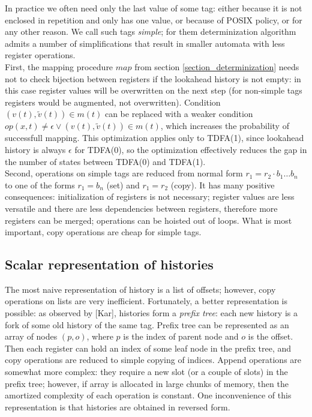 \documentclass{article}
\newcommand{\Xin}{\!\in\!}
\newcommand{\Xeq}{\!=\!}
\theoremstyle{definition}
\begin{document}
\begin{multicols}{2}
In practice we often need only the last value of some tag:
either because it is not enclosed in repetition and only has one value, or because of POSIX policy, or for any other reason.
We call such tags \emph{simple};
for them determinization algorithm admits a number of simplifications
that result in smaller automata with less register operations.
\\

First, the mapping procedure $map$ from section \ref{section_determinization}
needs not to check bijection between registers if the lookahead history is not empty:
in this case register values will be overwritten on the next step
(for non-simple tags registers would be augmented, not overwritten).
Condition $(v(t), \widetilde{v}(t)) \Xin m(t)$
can be replaced with a weaker condition $op(x, t) \!\neq\! \epsilon \vee (v(t), \widetilde{v}(t)) \Xin m(t)$,
which increases the probability of successfull mapping.
This optimization applies only to TDFA(1), since lookahead history is always $\epsilon$ for TDFA(0),
so the optimization effectively reduces the gap in the number of states between TDFA(0) and TDFA(1).
\\

Second, operations on simple tags are reduced from normal form $r_1 \Xeq r_2 \cdot b_1 \dots b_n$
to one of the forms $r_1 \Xeq b_n$ (set) and $r_1 \Xeq r_2$ (copy).
It has many positive consequences:
initialization of registers is not necessary;
register values are less versatile and there are less dependencies between registers, therefore more registers can be merged;
operations can be hoisted out of loops.
What is most important, copy operations are cheap for simple tags.

\subsection*{Scalar representation of histories}

The most naive representation of history is a list of offsets;
however, copy operations on lists are very inefficient.
Fortunately, a better representation is possible: as observed by [Kar], histories form a \emph{prefix tree}:
each new history is a fork of some old history of the same tag.
Prefix tree can be represented as an array of nodes $(p, o)$,
where $p$ is the index of parent node and $o$ is the offset.
Then each register can hold an index of some leaf node in the prefix tree,
and copy operations are reduced to simple copying of indices.
Append operations are somewhat more complex: they require a new slot (or a couple of slots) in the prefix tree;
however, if array is allocated in large chunks of memory,
then the amortized complexity of each operation is constant.
One inconvenience of this representation is that histories are obtained in reversed form.


\end{multicols}
\end{document}

